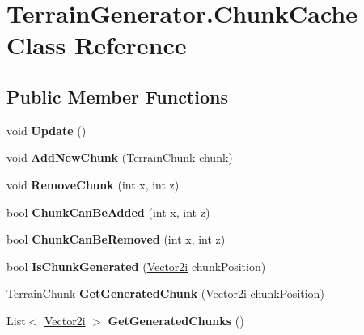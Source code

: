 \hypertarget{class_terrain_generator_1_1_chunk_cache}{}\section{Terrain\+Generator.\+Chunk\+Cache Class Reference}
\label{class_terrain_generator_1_1_chunk_cache}
\subsection*{Public Member Functions}
\begin{DoxyCompactItemize}
\item 
\mbox{\label{class_terrain_generator_1_1_chunk_cache_a634f6d4f76a9a0f772ce58b24c59b3a1}} 
void {\bfseries Update} ()
\item 
\mbox{\label{class_terrain_generator_1_1_chunk_cache_aeec39940a5770da7992058502d07d9ea}} 
void {\bfseries Add\+New\+Chunk} (\hyperlink{class_terrain_generator_1_1_terrain_chunk}{Terrain\+Chunk} chunk)
\item 
\mbox{\label{class_terrain_generator_1_1_chunk_cache_aa7d3ccbafd3da46ba061b8ca4b02cd28}} 
void {\bfseries Remove\+Chunk} (int x, int z)
\item 
\mbox{\label{class_terrain_generator_1_1_chunk_cache_ad6a6d36166d146a0307c9a085f6c2944}} 
bool {\bfseries Chunk\+Can\+Be\+Added} (int x, int z)
\item 
\mbox{\label{class_terrain_generator_1_1_chunk_cache_aa464ff7c171f041bc0ce36c15d8b14e2}} 
bool {\bfseries Chunk\+Can\+Be\+Removed} (int x, int z)
\item 
\mbox{\label{class_terrain_generator_1_1_chunk_cache_a40388252b52bcc4e6d8b0d8e0bc6ce34}} 
bool {\bfseries Is\+Chunk\+Generated} (\hyperlink{class_terrain_generator_1_1_vector2i}{Vector2i} chunk\+Position)
\item 
\mbox{\label{class_terrain_generator_1_1_chunk_cache_a27d2056a252f119cc976a3ee5f9ed9eb}} 
\hyperlink{class_terrain_generator_1_1_terrain_chunk}{Terrain\+Chunk} {\bfseries Get\+Generated\+Chunk} (\hyperlink{class_terrain_generator_1_1_vector2i}{Vector2i} chunk\+Position)
\item 
\mbox{\label{class_terrain_generator_1_1_chunk_cache_a334802dd71d9ab71a06e608cbc965d9d}} 
List$<$ \hyperlink{class_terrain_generator_1_1_vector2i}{Vector2i} $>$ {\bfseries Get\+Generated\+Chunks} ()
\end{DoxyCompactItemize}
